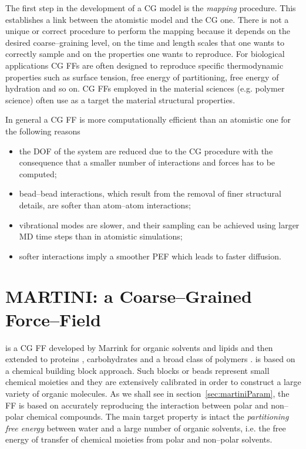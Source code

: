 The first step in the development of a \ac{CG} model is the \textit{mapping} procedure. This establishes a link
between the atomistic model and the \ac{CG} one. There is not a unique or correct procedure to perform the
mapping because it depends on the desired coarse--graining level, on the time and length scales that one wants to
correctly sample and on the properties one wants to reproduce. For biological applications \ac{CG} \acp{FF} are
often designed to reproduce specific thermodynamic properties such as surface tension, free energy of
partitioning, free energy of hydration and so on. \ac{CG} \acp{FF} employed in the material sciences (e.g.
polymer science) often use as a target the material structural properties.

In general a \ac{CG} \ac{FF} is more computationally efficient than an atomistic one for the following reasons
\begin{itemize}
\item the \ac{DOF} of the system are reduced due to the \ac{CG} procedure with the consequence that a smaller number of interactions and forces has to be computed;
\item bead--bead interactions, which result from the removal of finer structural details, are softer than atom--atom interactions;
\item vibrational modes are slower, and their sampling can be achieved using larger \ac{MD} time steps than in atomistic simulations;
\item softer interactions imply a smoother \ac{PEF} which leads to faster diffusion.
\end{itemize}

\section{MARTINI: a Coarse--Grained Force--Field}
\label{sec:martini}
\martini is a \ac{CG} \ac{FF} developed by Marrink \etal \cite{Martini} for organic solvents and lipids and
then extended to proteins \cite{MartiniProtein}, carbohydrates \cite{MartiniCarbo} and a broad class of polymers
\cite{MartiniPolymers}. \martini is based on a chemical building block approach. Such \martini blocks or beads
represent small chemical moieties and they are extensively calibrated in order to construct a large variety of
organic molecules. As we shall see in section~\ref{sec:martiniParam}, the \ac{FF} is based on accurately
reproducing the interaction between polar and non--polar chemical compounds. The main target property is intact
the \textit{partitioning free energy} between water and a large number of organic solvents, i.e. the free energy
of transfer of chemical moieties from polar and non--polar solvents.

